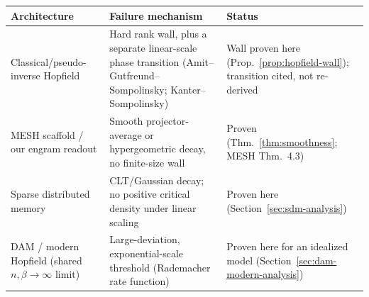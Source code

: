 \documentclass[11pt]{article}
\newcommand{\toprule}{\hline\hline}
\newcommand{\midrule}{\hline}
\newcommand{\bottomrule}{\hline\hline}
\begin{document}
\begin{center}
\begin{tabular}{p{3.1cm}p{4.7cm}p{4.4cm}}
\toprule
Architecture & Failure mechanism & Status \\
\midrule
Classical/pseudo-inverse Hopfield & Hard rank wall, plus a separate linear-scale phase
transition (Amit--Gutfreund--Sompolinsky; Kanter--Sompolinsky) & Wall proven here
(Prop.~\ref{prop:hopfield-wall}); transition cited, not re-derived \\[4pt]
MESH scaffold / our engram readout & Smooth projector-average or hypergeometric decay, no
finite-size wall & Proven (Thm.~\ref{thm:smoothness}; MESH Thm.\ 4.3) \\[4pt]
Sparse distributed memory & CLT/Gaussian decay; no positive critical density under linear
scaling & Proven here (Section~\ref{sec:sdm-analysis}) \\[4pt]
DAM / modern Hopfield (shared $n,\beta\to\infty$ limit) & Large-deviation, exponential-scale
threshold (Rademacher rate function) & Proven here for an idealized model
(Section~\ref{sec:dam-modern-analysis}) \\
\bottomrule
\end{tabular}
\end{center}
\end{document}
